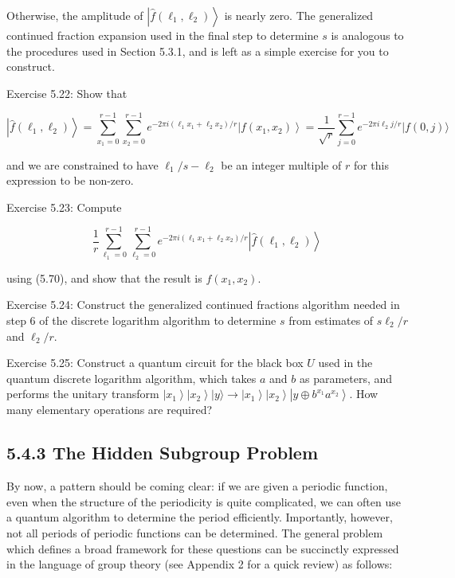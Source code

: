 Otherwise, the amplitude of $\left|\hat{f}\left(\ell_{1}, \ell_{2}\right)\right\rangle$ is nearly zero. The generalized continued fraction expansion used in the final step to determine $s$ is analogous to the procedures used in Section 5.3.1, and is left as a simple exercise for you to construct.

Exercise 5.22: Show that

\begin{equation}
    \left|\hat{f}\left(\ell_{1}, \ell_{2}\right)\right\rangle=\sum_{x_{1}=0}^{r-1} \sum_{x_{2}=0}^{r-1} e^{-2 \pi i\left(\ell_{1} x_{1}+\ell_{2} x_{2}\right) / r}\left|f\left(x_{1}, x_{2}\right)\right\rangle=\frac{1}{\sqrt{r}} \sum_{j=0}^{r-1} e^{-2 \pi i \ell_{2} j / r}|f(0, j)\rangle \tag{5.72}
\end{equation}

and we are constrained to have $\ell_{1} / s-\ell_{2}$ be an integer multiple of $r$ for this expression to be non-zero.

Exercise 5.23: Compute

\begin{equation}
    \frac{1}{r} \sum_{\ell_{1}=0}^{r-1} \sum_{\ell_{2}=0}^{r-1} e^{-2 \pi i\left(\ell_{1} x_{1}+\ell_{2} x_{2}\right) / r}\left|\hat{f}\left(\ell_{1}, \ell_{2}\right)\right\rangle \tag{5.73}
\end{equation}

using (5.70), and show that the result is $f\left(x_{1}, x_{2}\right)$.

Exercise 5.24: Construct the generalized continued fractions algorithm needed in\\
step 6 of the discrete logarithm algorithm to determine $s$ from estimates of $s \ell_{2} / r$ and $\ell_{2} / r$.

Exercise 5.25: Construct a quantum circuit for the black box $U$ used in the quantum discrete logarithm algorithm, which takes $a$ and $b$ as parameters, and performs the unitary transform $\left|x_{1}\right\rangle\left|x_{2}\right\rangle|y\rangle \rightarrow\left|x_{1}\right\rangle\left|x_{2}\right\rangle\left|y \oplus b^{x_{1}} a^{x_{2}}\right\rangle$. How many elementary operations are required?

\subsection{5.4.3 The Hidden Subgroup Problem}
By now, a pattern should be coming clear: if we are given a periodic function, even when the structure of the periodicity is quite complicated, we can often use a quantum algorithm to determine the period efficiently. Importantly, however, not all periods of periodic functions can be determined. The general problem which defines a broad framework for these questions can be succinctly expressed in the language of group theory (see Appendix 2 for a quick review) as follows:

